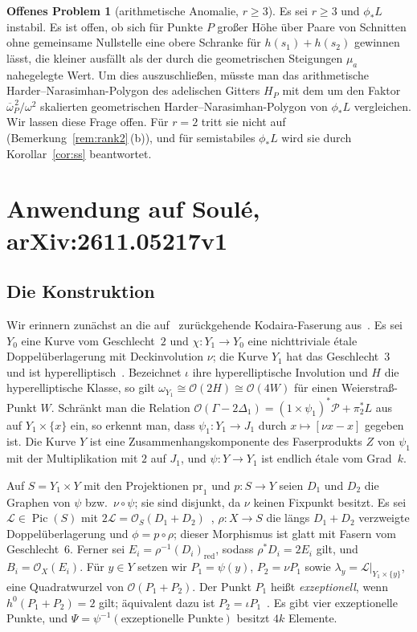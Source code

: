 \documentclass[11pt]{article}
\theoremstyle{definition}
\newtheorem{problem}[theorem]{Offenes Problem}
\theoremstyle{remark}
\DeclareMathOperator{\Pic}{Pic}
\newcommand{\OO}{\mathcal{O}}
\newcommand{\cL}{\mathcal{L}}
\newcommand{\ob}{\overline{\omega}}
\begin{document}
\begin{problem}[arithmetische Anomalie, $r\ge 3$]\label{prob:anomaly}
Es sei $r\ge 3$ und $\phi_*L$ instabil. Es ist offen, ob sich für Punkte $P$
großer Höhe über Paare von Schnitten ohne gemeinsame Nullstelle eine obere
Schranke für $h(s_1)+h(s_2)$ gewinnen lässt, die kleiner ausfällt als der durch
die geometrischen Steigungen $\mu_a$ nahegelegte Wert. Um dies auszuschließen,
müsste man das arithmetische Harder--Narasimhan-Polygon des adelischen Gitters
$H_P$ mit dem um den Faktor $\ob_P^{\,2}/\omega^2$ skalierten geometrischen
Harder--Narasimhan-Polygon von $\phi_*L$ vergleichen. Wir lassen diese Frage
offen. Für $r=2$ tritt sie nicht auf (Bemerkung~\ref{rem:rank2}\,(b)), und für
semistabiles $\phi_*L$ wird sie durch Korollar~\ref{cor:ss} beantwortet.
\end{problem}

\section{Anwendung auf Soul\'e, arXiv:2611.05217v1}\label{sec:soule}

\subsection{Die Konstruktion}
Wir erinnern zunächst an die auf~\cite{Ko67,MD85} zurückgehende Kodaira-Faserung
aus~\cite[\S\S3, 5]{So26}. Es sei $Y_0$ eine Kurve vom Geschlecht~$2$ und
$\chi\colon Y_1\to Y_0$ eine nichttriviale étale Doppelüberlagerung mit
Deckinvolution $\nu$; die Kurve $Y_1$ hat das Geschlecht~$3$ und ist
hyperelliptisch~\cite[Prop.~4\,i)]{So26}. Bezeichnet $\iota$ ihre
hyperelliptische Involution und $H$ die hyperelliptische Klasse, so gilt
$\omega_{Y_1}\cong\OO(2H)\cong\OO(4W)$ für einen Weierstraß-Punkt $W$. Schränkt
man die Relation $\OO(\Gamma-2\Delta_1)=(1\times\psi_1)^*\mathcal{P}+\pi_2^*L$
aus~\cite[\S5.1]{So26} auf $Y_1\times\{x\}$ ein, so erkennt man, dass
$\psi_1\colon Y_1\to J_1$ durch $x\mapsto[\nu x-x]$ gegeben ist. Die Kurve $Y$
ist eine Zusammenhangskomponente des Faserprodukts $Z$ von $\psi_1$ mit der
Multiplikation mit $2$ auf $J_1$, und $\psi\colon Y\to Y_1$ ist endlich étale vom
Grad~$k$.

Auf $S=Y_1\times Y$ mit den Projektionen $\mathrm{pr}_1$ und $p\colon S\to Y$
seien $D_1$ und $D_2$ die Graphen von $\psi$ bzw.\ $\nu\circ\psi$; sie sind
disjunkt, da $\nu$ keinen Fixpunkt besitzt. Es sei $\cL\in\Pic(S)$ mit
$2\cL=\OO_S(D_1+D_2)$~\cite{MD85}, $\rho\colon X\to S$ die längs $D_1+D_2$
verzweigte Doppelüberlagerung und $\phi=p\circ\rho$; dieser Morphismus ist glatt
mit Fasern vom Geschlecht~$6$. Ferner sei $E_i=\rho^{-1}(D_i)_{\mathrm{red}}$,
sodass $\rho^*D_i=2E_i$ gilt, und $B_i=\OO_X(E_i)$. Für $y\in Y$ setzen wir
$P_1=\psi(y)$, $P_2=\nu P_1$ sowie $\lambda_y=\cL|_{Y_1\times\{y\}}$, eine
Quadratwurzel von $\OO(P_1+P_2)$. Der Punkt $P_1$ heißt \emph{exzeptionell}, wenn
$h^0(P_1+P_2)=2$ gilt; äquivalent dazu ist
$P_2=\iota P_1$~\cite[Prop.~5\,iii)]{So26}. Es gibt vier exzeptionelle Punkte,
und $\Psi=\psi^{-1}(\text{exzeptionelle Punkte})$ besitzt $4k$ Elemente.
\end{document}
